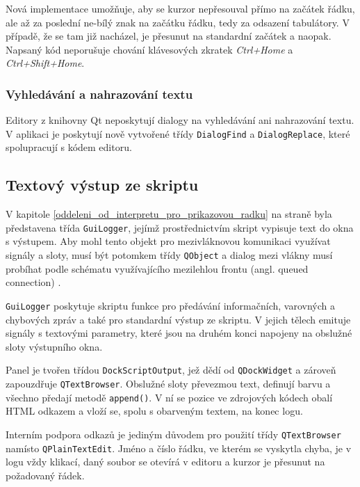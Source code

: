 \documentclass[11pt,twoside,a4paper]{book}
\begin{document}
Nová implementace umožňuje, aby se kurzor nepřesouval přímo na začátek řádku, ale až za poslední ne-bílý znak na začátku řádku, tedy za odsazení tabulátory. V případě, že se tam již nacházel, je přesunut na standardní začátek a naopak. Napsaný kód neporušuje chování klávesových zkratek \textit{Ctrl+Home} a \textit{Ctrl+Shift+Home}.


\subsubsection{Vyhledávání a nahrazování textu}

Editory z knihovny Qt neposkytují dialogy na vyhledávání ani nahrazování textu. V aplikaci je poskytují nově vytvořené třídy \texttt{DialogFind} a \texttt{DialogReplace}, které spolupracují s kódem editoru.


\subsection{Textový výstup ze skriptu}

V kapitole \ref{oddeleni_od_interpretu_pro_prikazovou_radku} na straně \pageref{oddeleni_od_interpretu_pro_prikazovou_radku} byla představena třída \texttt{GuiLogger}, jejímž prostřednictvím skript vypisuje text do okna s výstupem. Aby mohl tento objekt pro mezivláknovou komunikaci využívat signály a sloty, musí být potomkem třídy \texttt{QObject} a dialog mezi vlákny musí probíhat podle schématu využívajícího mezilehlou frontu (angl. queued connection) \cite{qt_threads}.

\texttt{GuiLogger} poskytuje skriptu funkce pro předávání informačních, varovných a chybových zpráv a také pro standardní výstup ze skriptu. V jejich tělech emituje signály s textovými parametry, které jsou na druhém konci napojeny na obslužné sloty výstupního okna.

Panel je tvořen třídou \texttt{DockScriptOutput}, jež dědí od \texttt{QDockWidget} a zároveň zapouzdřuje \texttt{QTextBrowser}. Obslužné sloty převezmou text, definují barvu a všechno předají metodě \texttt{append()}. V ní se pozice ve zdrojových kódech obalí HTML odkazem a vloží se, spolu s obarveným textem, na konec logu.

Interním podpora odkazů je jediným důvodem pro použití třídy \texttt{QTextBrowser} namísto \texttt{QPlainTextEdit}. Jméno a číslo řádku, ve kterém se vyskytla chyba, je v logu vždy klikací, daný soubor se otevírá v editoru a kurzor je přesunut na požadovaný řádek.
\end{document}
